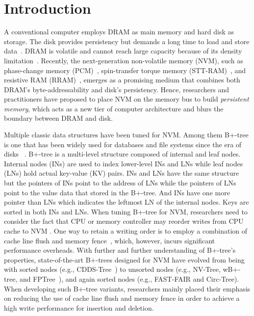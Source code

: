 \section{Introduction}
A conventional computer employs DRAM as main memory and hard disk as storage. 
The disk provides persistency but demands a long time to load and store data~\cite{b1}. 
DRAM is volatile and cannot reach large capacity because of its density limitation~\cite{lee2009architecting, qureshi2009scalable, zhou2009durable}. 
Recently, the next-generation non-volatile memory (NVM), such as phase-change memory (PCM)~\cite{raoux2008phase}, spin-transfer torque memory (STT-RAM)~\cite{kawahara2010scalable}, and resistive RAM (RRAM)~\cite{chang2016resistance}, emerges as a promising medium that combines both DRAM's byte-addressability and disk's persistency. Hence, researchers and practitioners have proposed to place NVM on the memory bus to build {\em persistent memory}, which acts
as a new tier of computer architecture and blurs the boundary between DRAM and disk.


Multiple classic data structures have been tuned for NVM. Among them 
B+-tree is one that has been widely used for databases and file systems since the era of disks~
\cite{bayer2002organization}. 
B+-tree is a multi-level structure composed of internal and leaf nodes. 
Internal nodes (INs) are used to index lower-level INs and LNs while leaf nodes (LNs) hold actual key-value (KV) pairs. 
INs and LNs have the same structure but the pointers of INs point to the address of LNs while the pointers of LNs point to the value data that stored in the B+-tree. And INs have one more pointer than LNs which indicates the leftmost LN of the internal nodes.
 Keys are sorted in both INs and LNs. When tuning B+-tree for NVM, 
 researchers need to consider the fact that CPU or memory controller may reorder writes from
 CPU cache to NVM \cite{yang2015nv, hwang2018endurable, wang2019circ}. One way to retain a writing order is to 
employ a combination of cache line flush and memory fence~\cite{moraru2013consistent}, which, however, incurs significant performance overheads. 
With further and further understanding of B+-tree's properties, state-of-the-art 
B+-trees designed for NVM
have evolved from being with sorted nodes (e.g., CDDS-Tree~\cite{venkataraman2011consistent}) to unsorted nodes (e.g., NV-Tree, wB+-tree, and FPTree~\cite{oukid2016fptree}), and again sorted nodes (e.g., FAST-FAIR and Circ-Tree). When developing such B+-tree variants, researchers
 mainly placed their emphasis on reducing the use of cache line flush and memory fence in order to achieve a high write performance for insertion and deletion. 

